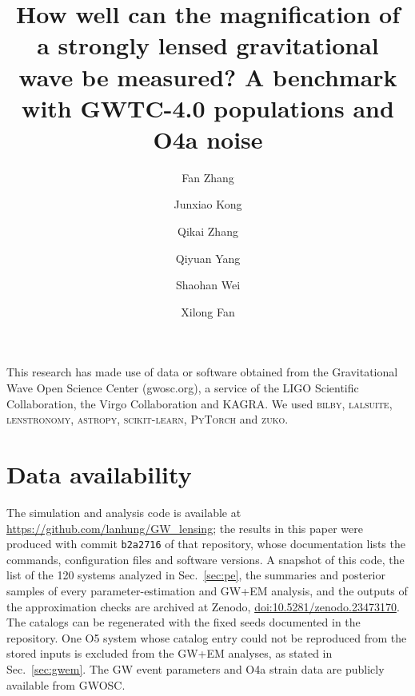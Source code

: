 \documentclass[aps,prd,twocolumn,superscriptaddress,nofootinbib,floatfix]{revtex4-2}
\begin{document}
\title{How well can the magnification of a strongly lensed gravitational wave be measured? A benchmark with GWTC-4.0 populations and O4a noise}

\author{Fan Zhang}
\author{Junxiao Kong}
\author{Qikai Zhang}
\author{Qiyuan Yang}
\author{Shaohan Wei}
\author{Xilong Fan}


\maketitle






\begin{acknowledgments}
This research has made use of data or software obtained from the Gravitational Wave Open Science Center (gwosc.org), a service of the LIGO Scientific Collaboration, the Virgo Collaboration and KAGRA. We used \textsc{bilby}, \textsc{lalsuite}, \textsc{lenstronomy}, \textsc{astropy}, \textsc{scikit-learn}, \textsc{PyTorch} and \textsc{zuko}.
\end{acknowledgments}

\section*{Data availability}
The simulation and analysis code is available at \url{https://github.com/lanhung/GW_lensing}; the results in this paper were produced with commit \texttt{b2a2716} of that repository, whose documentation lists the commands, configuration files and software versions. A snapshot of this code, the list of the 120 systems analyzed in Sec.~\ref{sec:pe}, the summaries and posterior samples of every parameter-estimation and GW+EM analysis, and the outputs of the approximation checks are archived at Zenodo, \href{https://doi.org/10.5281/zenodo.23473170}{doi:10.5281/zenodo.23473170}. The catalogs can be regenerated with the fixed seeds documented in the repository. One O5 system whose catalog entry could not be reproduced from the stored inputs is excluded from the GW+EM analyses, as stated in Sec.~\ref{sec:gwem}. The GW event parameters and O4a strain data are publicly available from GWOSC.

\appendix



\end{document}
